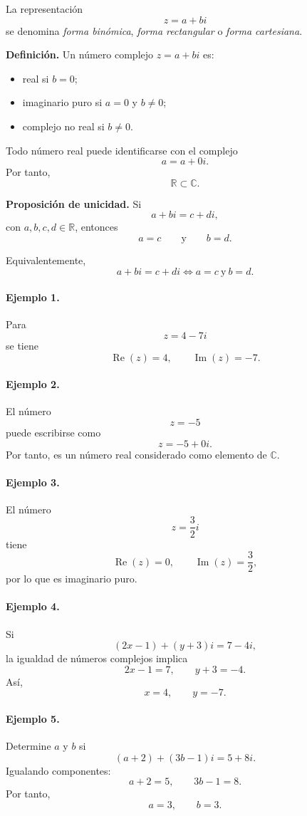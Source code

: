 La representación
\[
z=a+bi
\]
se denomina \emph{forma binómica}, \emph{forma rectangular} o
\emph{forma cartesiana}.

\textbf{Definición.}
Un número complejo $z=a+bi$ es:
\begin{itemize}
    \item real si $b=0$;
    \item imaginario puro si $a=0$ y $b\neq 0$;
    \item complejo no real si $b\neq 0$.
\end{itemize}

Todo número real puede identificarse con el complejo
\[
a=a+0i.
\]
Por tanto,
\[
\boxed{\mathbb{R}\subset\mathbb{C}.}
\]

\textbf{Proposición de unicidad.}
Si
\[
a+bi=c+di,
\]
con $a,b,c,d\in\mathbb{R}$, entonces
\[
a=c
\qquad\text{y}\qquad
b=d.
\]

Equivalentemente,
\[
\boxed{
a+bi=c+di
\iff
a=c\ \text{y}\ b=d.
}
\]

\paragraph{Ejemplo 1.}
Para
\[
z=4-7i
\]
se tiene
\[
\operatorname{Re}(z)=4,
\qquad
\operatorname{Im}(z)=-7.
\]

\paragraph{Ejemplo 2.}
El número
\[
z=-5
\]
puede escribirse como
\[
z=-5+0i.
\]
Por tanto, es un número real considerado como elemento de $\mathbb{C}$.

\paragraph{Ejemplo 3.}
El número
\[
z=\frac32 i
\]
tiene
\[
\operatorname{Re}(z)=0,
\qquad
\operatorname{Im}(z)=\frac32,
\]
por lo que es imaginario puro.

\paragraph{Ejemplo 4.}
Si
\[
(2x-1)+(y+3)i=7-4i,
\]
la igualdad de números complejos implica
\[
2x-1=7,
\qquad
y+3=-4.
\]
Así,
\[
\boxed{x=4,\qquad y=-7.}
\]

\paragraph{Ejemplo 5.}
Determine $a$ y $b$ si
\[
(a+2)+(3b-1)i=5+8i.
\]
Igualando componentes:
\[
a+2=5,
\qquad
3b-1=8.
\]
Por tanto,
\[
\boxed{a=3,\qquad b=3.}
\]

